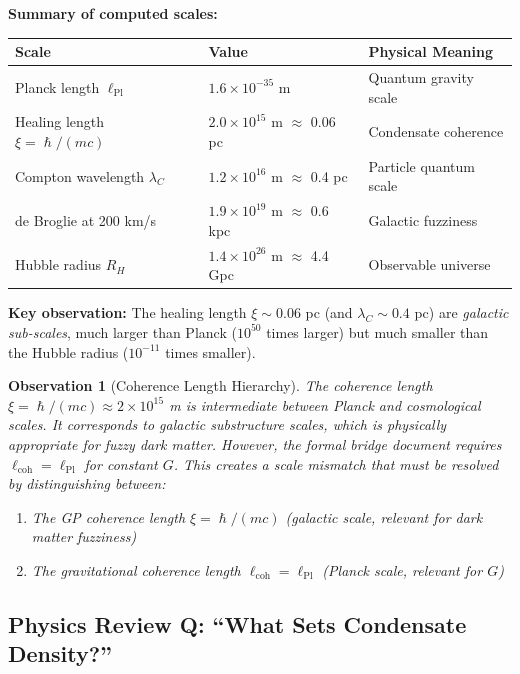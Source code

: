 \documentclass[11pt,a4paper]{article}
\newcommand{\ee}[1]{\times 10^{#1}}
\newcommand{\hbar}{\ensuremath{\hslash}}
\newcommand{\lPl}{\ensuremath{\ell_{\mathrm{Pl}}}}
\newtheorem{observation}{Observation}
\begin{document}
\textbf{Summary of computed scales:}
\begin{center}
\begin{tabular}{lll}
\toprule
\textbf{Scale} & \textbf{Value} & \textbf{Physical Meaning} \\
\midrule
Planck length $\lPl$ & $1.6 \ee{-35}$ m & Quantum gravity scale \\
Healing length $\xi = \hbar/(mc)$ & $2.0 \ee{15}$ m $\approx$ 0.06 pc & Condensate coherence \\
Compton wavelength $\lambda_C$ & $1.2 \ee{16}$ m $\approx$ 0.4 pc & Particle quantum scale \\
de Broglie at 200 km/s & $1.9 \ee{19}$ m $\approx$ 0.6 kpc & Galactic fuzziness \\
Hubble radius $R_H$ & $1.4 \ee{26}$ m $\approx$ 4.4 Gpc & Observable universe \\
\bottomrule
\end{tabular}
\end{center}

\textbf{Key observation:} The healing length $\xi \sim 0.06$ pc (and $\lambda_C \sim 0.4$ pc) are \emph{galactic sub-scales}, much larger than Planck ($10^{50}$ times larger) but much smaller than the Hubble radius ($10^{-11}$ times smaller).

\begin{observation}[Coherence Length Hierarchy]
The coherence length $\xi = \hbar/(mc) \approx 2 \ee{15}$ m is intermediate between Planck and cosmological scales. It corresponds to \emph{galactic substructure} scales, which is physically appropriate for fuzzy dark matter. However, the formal bridge document requires $\ell_{\mathrm{coh}} = \lPl$ for constant $G$. This creates a scale mismatch that must be resolved by distinguishing between:
\begin{enumerate}
    \item The \emph{GP coherence length} $\xi = \hbar/(mc)$ (galactic scale, relevant for dark matter fuzziness)
    \item The \emph{gravitational coherence length} $\ell_{\mathrm{coh}} = \lPl$ (Planck scale, relevant for $G$)
\end{enumerate}
\end{observation}

\subsection{Physics Review Q: ``What Sets Condensate Density?''}
\end{document}
